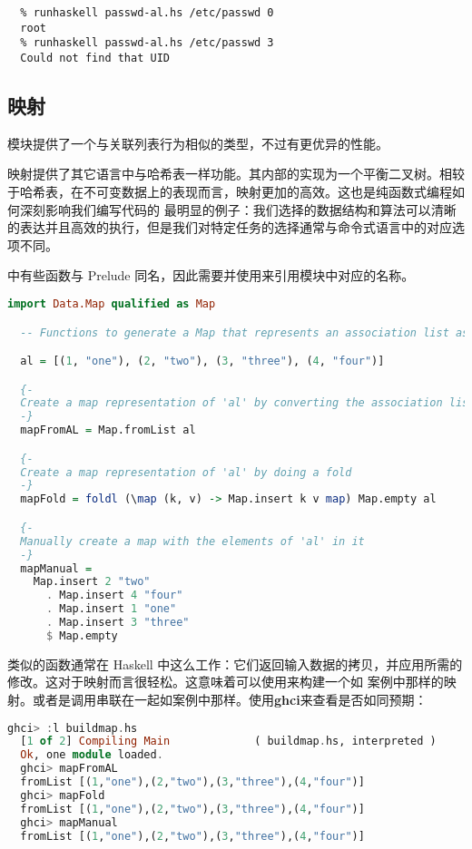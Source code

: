 \documentclass[./main.tex]{subfiles}
\begin{document}
\begin{lstlisting}
  % runhaskell passwd-al.hs /etc/passwd 0
  root
  % runhaskell passwd-al.hs /etc/passwd 3
  Could not find that UID
\end{lstlisting}

\subsection*{映射}

模块提供了一个与关联列表行为相似的类型，不过有更优异的性能。

映射提供了其它语言中与哈希表一样功能。其内部的实现为一个平衡二叉树。相较于哈希表，在不可变数据上的表现而言，映射更加的高效。这也是纯函数式编程如何深刻影响我们编写代码的
最明显的例子：我们选择的数据结构和算法可以清晰的表达并且高效的执行，但是我们对特定任务的选择通常与命令式语言中的对应选项不同。

中有些函数与 Prelude 同名，因此需要并使用来引用模块中对应的名称。

\begin{lstlisting}[language=Haskell]
  import Data.Map qualified as Map

  -- Functions to generate a Map that represents an association list as a map

  al = [(1, "one"), (2, "two"), (3, "three"), (4, "four")]

  {-
  Create a map representation of 'al' by converting the association list using Map.fromList
  -}
  mapFromAL = Map.fromList al

  {-
  Create a map representation of 'al' by doing a fold
  -}
  mapFold = foldl (\map (k, v) -> Map.insert k v map) Map.empty al

  {-
  Manually create a map with the elements of 'al' in it
  -}
  mapManual =
    Map.insert 2 "two"
      . Map.insert 4 "four"
      . Map.insert 1 "one"
      . Map.insert 3 "three"
      $ Map.empty
\end{lstlisting}

类似的函数通常在 Haskell 中这么工作：它们返回输入数据的拷贝，并应用所需的修改。这对于映射而言很轻松。这意味着可以使用来构建一个如
案例中那样的映射。或者是调用串联在一起如案例中那样。使用\textbf{ghci}来查看是否如同预期：

\begin{lstlisting}[language=Haskell]
  ghci> :l buildmap.hs
  [1 of 2] Compiling Main             ( buildmap.hs, interpreted )
  Ok, one module loaded.
  ghci> mapFromAL
  fromList [(1,"one"),(2,"two"),(3,"three"),(4,"four")]
  ghci> mapFold
  fromList [(1,"one"),(2,"two"),(3,"three"),(4,"four")]
  ghci> mapManual
  fromList [(1,"one"),(2,"two"),(3,"three"),(4,"four")]
\end{lstlisting}
\end{document}
